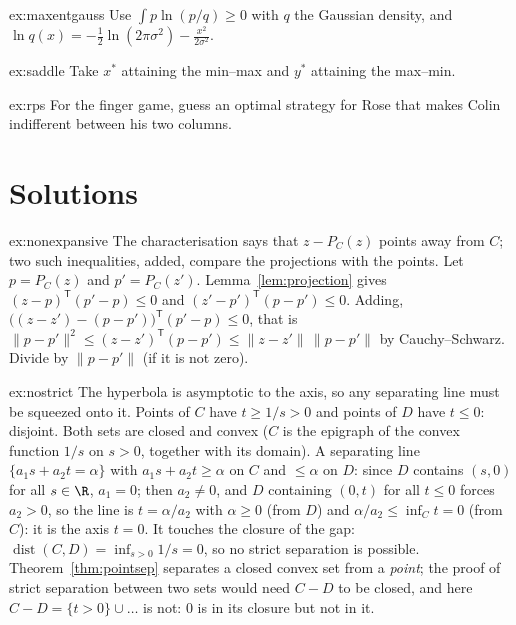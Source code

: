 \begin{hint}{ex:maxentgauss}
Use $\int p\ln(p/q)\ge0$ with $q$ the Gaussian density, and $\ln q(x)=-\frac12\ln(2\pi\sigma^2)-\frac{x^2}{2\sigma^2}$.
\end{hint}
\begin{hint}{ex:saddle}
Take $x^*$ attaining the min--max and $y^*$ attaining the max--min.
\end{hint}
\begin{hint}{ex:rps}
For the finger game, guess an optimal strategy for Rose that makes Colin indifferent between his two columns.
\end{hint}

\section{Solutions}

\begin{solution}{ex:nonexpansive}
\idea The characterisation says that $z-P_C(z)$ points away from $C$; two such inequalities, added, compare the projections with the points.
\writeup Let $p=P_C(z)$ and $p'=P_C(z')$. Lemma~\ref{lem:projection} gives $(z-p)^{\mathsf T}(p'-p)\le0$ and $(z'-p')^{\mathsf T}(p-p')\le0$. Adding,
$\bigl((z-z')-(p-p')\bigr)^{\mathsf T}(p'-p)\le0$, that is $\|p-p'\|^2\le(z-z')^{\mathsf T}(p-p')\le\|z-z'\|\,\|p-p'\|$ by Cauchy--Schwarz. Divide by $\|p-p'\|$ (if it is not zero).
\end{solution}

\begin{solution}{ex:nostrict}
\idea The hyperbola is asymptotic to the axis, so any separating line must be squeezed onto it.
\writeup Points of $C$ have $t\ge1/s>0$ and points of $D$ have $t\le0$: disjoint. Both sets are closed and convex ($C$ is the epigraph of the convex function $1/s$ on $s>0$, together with
its domain). A separating line $\{a_1s+a_2t=\alpha\}$ with $a_1s+a_2t\ge\alpha$ on $C$ and $\le\alpha$ on $D$: since $D$ contains $(s,0)$ for all $s\in\R$, $a_1=0$; then $a_2\ne0$, and $D$
containing $(0,t)$ for all $t\le0$ forces $a_2>0$, so the line is $t=\alpha/a_2$ with $\alpha\ge0$ (from $D$) and $\alpha/a_2\le\inf_Ct=0$ (from $C$): it is the axis $t=0$. It touches the closure
of the gap: $\operatorname{dist}(C,D)=\inf_{s>0}1/s=0$, so no strict separation is possible. Theorem~\ref{thm:pointsep} separates a closed convex set from a \emph{point}; the
proof of strict separation between two sets would need $C-D$ to be closed, and here $C-D=\{t>0\}\cup\dots$ is not: $0$ is in its closure but not in it.
\end{solution}

